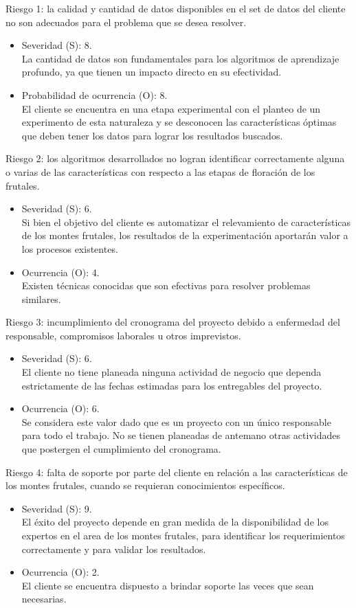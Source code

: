 \documentclass[
11pt, %
]{charter}
\begin{document}
Riesgo 1: la calidad y cantidad de datos disponibles en el set de datos del cliente no son
adecuados para el problema que se desea resolver.
\begin{itemize}
	\item Severidad (S): 8. \\
    La cantidad de datos son fundamentales para los algoritmos de aprendizaje profundo, ya
    que tienen un impacto directo en su efectividad.
	\item Probabilidad de ocurrencia (O): 8. \\
	El cliente se encuentra en una etapa experimental con el planteo de un experimento de esta naturaleza y se desconocen
    las características óptimas que deben tener los datos para lograr los resultados
    buscados.
\end{itemize}   

Riesgo 2: los algoritmos desarrollados no logran identificar correctamente alguna o varias de las características
con respecto a las etapas de floración de los frutales.
\begin{itemize}
	\item Severidad (S): 6.\\
	Si bien el objetivo del cliente es automatizar el relevamiento de características de
    los montes frutales, los resultados de la experimentación aportarán valor a los procesos existentes.
	\item Ocurrencia (O): 4.\\
	Existen técnicas conocidas que son efectivas para resolver problemas similares.
\end{itemize}

Riesgo 3: incumplimiento del cronograma del proyecto debido a enfermedad del responsable,
compromisos laborales u otros imprevistos.
\begin{itemize}
	\item Severidad (S):  6.\\
	El cliente no tiene planeada ninguna actividad de negocio que dependa estrictamente de
    las fechas estimadas para los entregables del proyecto.
	\item Ocurrencia (O): 6.\\
	Se considera este valor dado que es un proyecto con un único responsable para todo el
    trabajo. No se tienen planeadas de antemano otras actividades que postergen el cumplimiento del cronograma.
\end{itemize}

Riesgo 4: falta de soporte por parte del cliente en relación a las características de los montes frutales, cuando
se requieran conocimientos específicos.
\begin{itemize}
	\item Severidad (S):  9.\\
	El éxito del proyecto depende en gran medida de la disponibilidad de los expertos en el
    area de los montes frutales, para identificar los requerimientos
    correctamente y para validar los resultados.
	\item Ocurrencia (O): 2.\\
	El cliente se encuentra dispuesto a brindar soporte las veces que sean necesarias.
\end{itemize}
\end{document}
